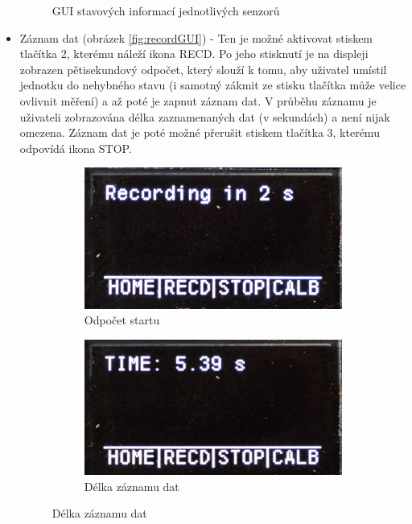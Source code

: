 \begin{itemize}
\begin{figure}[h]
\begin{subfigure}[b]{0.29\textwidth}
     \end{subfigure}

        \caption{GUI stavových informací jednotlivých senzorů}
        \label{fig:stateInfoGUI}
\end{figure}

\item Záznam dat (obrázek \ref{fig:recordGUI}) - Ten je možné aktivovat stiskem tlačítka 2, kterému náleží ikona RECD. Po jeho stisknutí je na displeji zobrazen pětisekundový odpočet, který slouží k tomu, aby uživatel umístil jednotku do nehybného stavu (i samotný zákmit ze stisku tlačítka může velice ovlivnit měření) a až poté je zapnut záznam dat. V průběhu záznamu je uživateli zobrazována délka zaznamenaných dat (v sekundách) a není nijak omezena. Záznam dat je poté možné přerušit stiskem tlačítka 3, kterému odpovídá ikona STOP.

\begin{figure}[h]
     \centering
     \begin{subfigure}[b]{0.29\textwidth}
         \centering
         \includegraphics[width=\textwidth]{obrazky/menuREC1}
         \caption{Odpočet startu}     
     \end{subfigure}
     \hfill
     \centering
     \begin{subfigure}[b]{0.29\textwidth}
         \centering
         \includegraphics[width=\textwidth]{obrazky/menuREC2}
         \caption{Délka záznamu dat}   
     \end{subfigure}


\end{figure}
\end{itemize}

